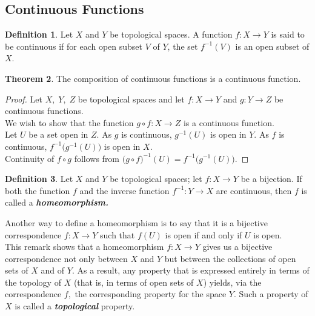 \documentclass{article}
\theoremstyle{definition}
\newtheorem{theorem}{Theorem}[section]
\newtheorem{defn}[theorem]{Definition}
\begin{document}
\subsection{Continuous Functions}
\begin{defn} 
  Let $X$ and $Y$ be topological spaces. A function $f:X\longrightarrow Y$ is said to be continuous if for each open subset $V$ of $Y$, the set $f^{-1}(V)$ is an open subset of $X$.
\end{defn}
\begin{theorem}\label{thm:compose continuous}
  The composition of continuous functions is a continuous function.
\end{theorem}
\begin{proof}
  Let $X,\;Y,\;Z$ be topological spaces and let $f:X \longrightarrow Y$ and $g:Y \longrightarrow Z$ be continuous functions.\\
  We wish to show that the function $g\circ f:X \longrightarrow Z$ is a continuous function.\\
  Let $U$ be a set open in $Z.$ As $g$ is continuous, $g^{-1}(U)$ is open in $Y.$ As $f$ is continuous, $f^{-1}\big(g^{-1}(U)\big)$ is open in $X.$\\
  Continuity of $f\circ g$ follows from $\big(g \circ f \big)^{-1}(U) = f^{-1}\big(g^{-1}(U)\big).$
\end{proof}
%
\begin{defn} 
  Let $X$ and $Y$ be topological spaces; let $f:X\longrightarrow Y$ be a bijection. If both the function $f$ and the inverse function $f^{-1}:Y\longrightarrow X$ are continuous, then $f$ is called a \textbf{\emph{homeomorphism.}}
\end{defn}
Another way to define a homeomorphism is to say that it is a bijective correspondence $f:X\longrightarrow Y$ such that $f(U)$ is open if and only if $U$ is open.\\
This remark shows that a homeomorphism $f:X \longrightarrow Y$ gives us a bijective correspondence not only between $X$ and $Y$ but between the collections of open sets of $X$ and of $Y.$ As a result, any property that is expressed entirely in terms of the topology of $X$ (that is, in terms of open sets of $X$) yields, via the correspondence $f,$ the corresponding property for the space $Y.$ Such a property of $X$ is called a \textbf{\emph{topological}} property.
%
\end{document}
